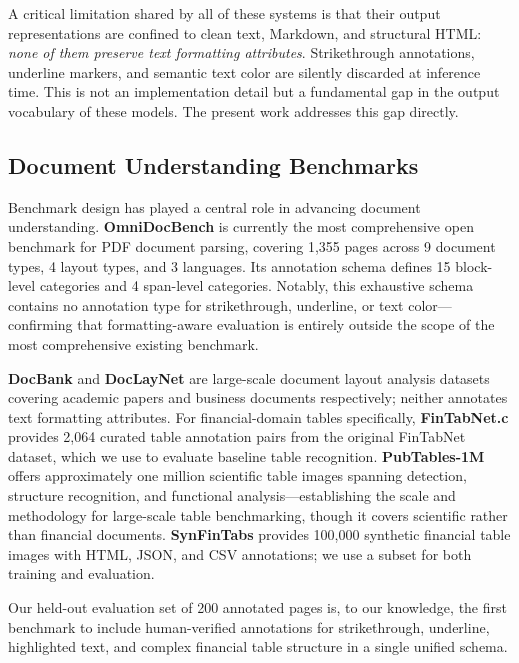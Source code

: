 \documentclass[10pt,twocolumn]{article}
\begin{document}
A critical limitation shared by all of these systems is that their output
representations are confined to clean text, Markdown, and structural HTML:
\textit{none of them preserve text formatting attributes}. Strikethrough
annotations, underline markers, and semantic text color are silently discarded
at inference time. This is not an implementation detail but a fundamental gap in
the output vocabulary of these models. The present work addresses this gap
directly.

\subsection{Document Understanding Benchmarks}
\label{sec:related:benchmarks}

Benchmark design has played a central role in advancing document understanding.
\textbf{OmniDocBench} \cite{ouyang2025omnidocbench} is currently the most
comprehensive open benchmark for PDF document parsing, covering 1{,}355 pages
across 9 document types, 4 layout types, and 3 languages. Its annotation schema
defines 15 block-level categories and 4 span-level categories. Notably, this
exhaustive schema contains no annotation type for strikethrough, underline, or
text color---confirming that formatting-aware evaluation is entirely outside the
scope of the most comprehensive existing benchmark.

\textbf{DocBank} \cite{li2020docbank} and \textbf{DocLayNet}
\cite{pfitzmann2022doclaynet} are large-scale document layout analysis datasets
covering academic papers and business documents respectively; neither annotates
text formatting attributes. For financial-domain tables specifically,
\textbf{FinTabNet.c} \cite{smock2023fintabnetc} provides 2{,}064 curated table
annotation pairs from the original FinTabNet dataset, which we use to evaluate
baseline table recognition. \textbf{PubTables-1M} \cite{smock2022pubtables}
offers approximately one million scientific table images spanning detection,
structure recognition, and functional analysis---establishing the scale and
methodology for large-scale table benchmarking, though it covers scientific
rather than financial documents. \textbf{SynFinTabs} \cite{bradley2024synfintabs}
provides 100{,}000 synthetic financial table images with HTML, JSON, and CSV
annotations; we use a subset for both training and evaluation.

Our held-out evaluation set of 200 annotated pages is, to our knowledge, the
first benchmark to include human-verified annotations for strikethrough,
underline, highlighted text, and complex financial table structure in a single unified
schema.
\end{document}
